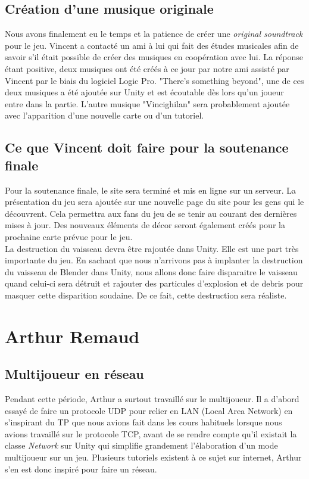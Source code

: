 \documentclass[10pt, titlepage]{report}
\begin{document}
\subsection{Création d'une musique originale}
Nous avons finalement eu le temps et la patience de créer une \textit{original soundtrack} pour le jeu. Vincent a contacté un ami à lui qui fait des études musicales afin de savoir s'il était possible de créer des musiques en coopération avec lui. La réponse étant positive, deux musiques ont été créés à ce jour par notre ami assisté par Vincent par le biais du logiciel Logic Pro. "There's something beyond", une de ces deux musiques a été ajoutée sur Unity et est écoutable dès lors qu'un joueur entre dans la partie. L'autre musique "Vincighilan" sera probablement ajoutée avec l'apparition d'une nouvelle carte ou d'un tutoriel.

\subsection{Ce que Vincent doit faire pour la soutenance finale}
Pour la soutenance finale, le site sera terminé et mis en ligne sur un serveur. La présentation du jeu sera ajoutée sur une nouvelle page du site pour les gens qui le découvrent. Cela permettra aux fans du jeu de se tenir au courant des dernières mises à jour. Des nouveaux éléments de décor seront également créés pour la prochaine carte prévue pour le jeu.\\

La destruction du vaisseau devra être rajoutée dans Unity. Elle est une part très importante du jeu. En sachant que nous n'arrivons pas à implanter la destruction du vaisseau de Blender dans Unity, nous allons donc faire disparaitre le vaisseau quand celui-ci sera détruit et rajouter des particules d'explosion et de debris pour masquer cette disparition soudaine. De ce fait, cette destruction sera réaliste.\\

\section{Arthur Remaud}

\subsection{Multijoueur en réseau}
Pendant cette période, Arthur a surtout travaillé sur le multijoueur. Il a d'abord essayé de faire un protocole UDP pour relier en LAN (Local Area Network) en s'inspirant du TP que nous avions fait dans les cours habituels lorsque nous avions travaillé sur le protocole TCP, avant de se rendre compte qu'il existait la classe \textit{Network} sur Unity qui simplifie grandement l'élaboration d'un mode multijoueur sur un jeu. Plusieurs tutoriels existent à ce sujet sur internet, Arthur s'en est donc inspiré pour faire un réseau.\\
\end{document}
